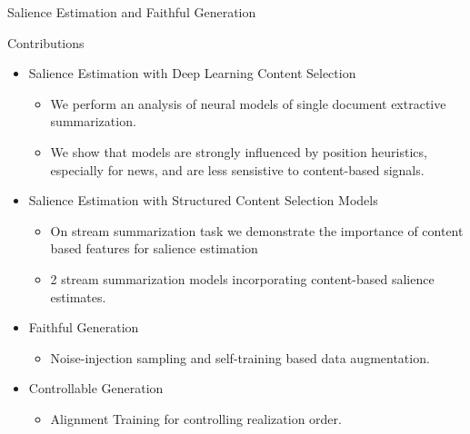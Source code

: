 \begin{frame}{Salience Estimation and Faithful Generation}
\begin{itemize}
\end{itemize}

\end{frame}

\begin{frame}{Contributions}
    \begin{itemize}
        \item Salience Estimation with Deep Learning Content Selection
            \begin{itemize}
                \item We perform an analysis of neural models of single document extractive summarization.
                \item We show that models are strongly influenced by  position heuristics, especially for news, and are less sensistive to content-based signals.
            \end{itemize}
            \vspace{5pt}
        \item<2-> Salience Estimation with Structured Content Selection Models 
            \begin{itemize}
                \item  On stream summarization task we demonstrate the importance of content based features for salience estimation
                \item 2 stream summarization models incorporating content-based salience estimates.
            \end{itemize}
            \vspace{10pt}
        \item<3-> Faithful Generation
        \begin{itemize}
            \item Noise-injection sampling and self-training based data augmentation.
        \end{itemize}
            \vspace{5pt}
        \item<4-> Controllable Generation
        \begin{itemize}
        \item Alignment Training for controlling realization order.
        \end{itemize}
    \end{itemize}
\end{frame}

